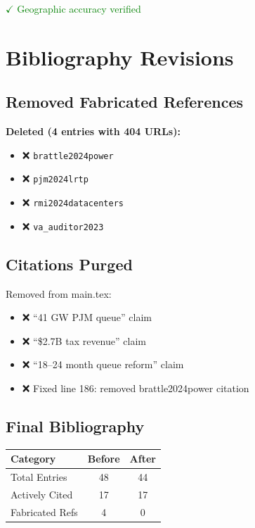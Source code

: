 \documentclass[11pt,a4paper]{article}
\begin{document}
\textcolor{green}{$\checkmark$ Geographic accuracy verified}

\section{Bibliography Revisions}

\subsection{Removed Fabricated References}

\textbf{Deleted (4 entries with 404 URLs):}
\begin{itemize}
\item {\color{red}❌} \texttt{brattle2024power}
\item {\color{red}❌} \texttt{pjm2024lrtp}
\item {\color{red}❌} \texttt{rmi2024datacenters}
\item {\color{red}❌} \texttt{va\_auditor2023}
\end{itemize}

\subsection{Citations Purged}

Removed from main.tex:
\begin{itemize}
\item ❌ ``41 GW PJM queue'' claim
\item ❌ ``\$2.7B tax revenue'' claim
\item ❌ ``18--24 month queue reform'' claim
\item ❌ Fixed line 186: removed brattle2024power citation
\end{itemize}

\subsection{Final Bibliography}

\begin{center}
\begin{tabular}{lcc}
\toprule
\textbf{Category} & \textbf{Before} & \textbf{After} \\
\midrule
Total Entries & 48 & 44 \\
Actively Cited & 17 & 17 \\
Fabricated Refs & 4 & 0 \\
\bottomrule
\end{tabular}
\end{center}
\end{document}
